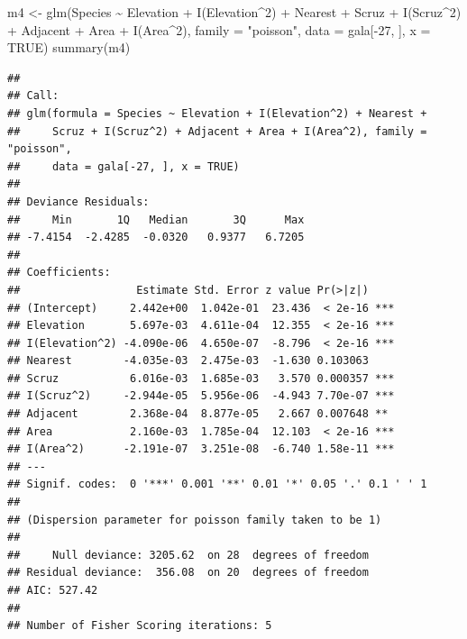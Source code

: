 \documentclass[
  ignorenonframetext,
]{beamer}
\newenvironment{Shaded}{\begin{snugshade}}{\end{snugshade}}
\newcommand{\AttributeTok}[1]{\textcolor[rgb]{0.77,0.63,0.00}{#1}}
\newcommand{\ConstantTok}[1]{\textcolor[rgb]{0.00,0.00,0.00}{#1}}
\newcommand{\DecValTok}[1]{\textcolor[rgb]{0.00,0.00,0.81}{#1}}
\newcommand{\FunctionTok}[1]{\textcolor[rgb]{0.00,0.00,0.00}{#1}}
\newcommand{\NormalTok}[1]{#1}
\newcommand{\OtherTok}[1]{\textcolor[rgb]{0.56,0.35,0.01}{#1}}
\newcommand{\SpecialCharTok}[1]{\textcolor[rgb]{0.00,0.00,0.00}{#1}}
\newcommand{\StringTok}[1]{\textcolor[rgb]{0.31,0.60,0.02}{#1}}
\begin{document}
\begin{frame}[fragile]{}
\protect\hypertarget{section-14}{}
\tiny

\begin{Shaded}
\begin{Highlighting}[]
\NormalTok{m4 }\OtherTok{\textless{}{-}} \FunctionTok{glm}\NormalTok{(Species }\SpecialCharTok{\textasciitilde{}}\NormalTok{ Elevation }\SpecialCharTok{+} \FunctionTok{I}\NormalTok{(Elevation}\SpecialCharTok{\^{}}\DecValTok{2}\NormalTok{) }\SpecialCharTok{+}\NormalTok{ Nearest }\SpecialCharTok{+}\NormalTok{ Scruz }\SpecialCharTok{+} 
            \FunctionTok{I}\NormalTok{(Scruz}\SpecialCharTok{\^{}}\DecValTok{2}\NormalTok{) }\SpecialCharTok{+}\NormalTok{ Adjacent }\SpecialCharTok{+}\NormalTok{ Area }\SpecialCharTok{+} \FunctionTok{I}\NormalTok{(Area}\SpecialCharTok{\^{}}\DecValTok{2}\NormalTok{), }\AttributeTok{family =} \StringTok{"poisson"}\NormalTok{,}
            \AttributeTok{data =}\NormalTok{ gala[}\SpecialCharTok{{-}}\DecValTok{27}\NormalTok{, ], }\AttributeTok{x =} \ConstantTok{TRUE}\NormalTok{)}
\FunctionTok{summary}\NormalTok{(m4)}
\end{Highlighting}
\end{Shaded}

\begin{verbatim}
## 
## Call:
## glm(formula = Species ~ Elevation + I(Elevation^2) + Nearest + 
##     Scruz + I(Scruz^2) + Adjacent + Area + I(Area^2), family = "poisson", 
##     data = gala[-27, ], x = TRUE)
## 
## Deviance Residuals: 
##     Min       1Q   Median       3Q      Max  
## -7.4154  -2.4285  -0.0320   0.9377   6.7205  
## 
## Coefficients:
##                  Estimate Std. Error z value Pr(>|z|)    
## (Intercept)     2.442e+00  1.042e-01  23.436  < 2e-16 ***
## Elevation       5.697e-03  4.611e-04  12.355  < 2e-16 ***
## I(Elevation^2) -4.090e-06  4.650e-07  -8.796  < 2e-16 ***
## Nearest        -4.035e-03  2.475e-03  -1.630 0.103063    
## Scruz           6.016e-03  1.685e-03   3.570 0.000357 ***
## I(Scruz^2)     -2.944e-05  5.956e-06  -4.943 7.70e-07 ***
## Adjacent        2.368e-04  8.877e-05   2.667 0.007648 ** 
## Area            2.160e-03  1.785e-04  12.103  < 2e-16 ***
## I(Area^2)      -2.191e-07  3.251e-08  -6.740 1.58e-11 ***
## ---
## Signif. codes:  0 '***' 0.001 '**' 0.01 '*' 0.05 '.' 0.1 ' ' 1
## 
## (Dispersion parameter for poisson family taken to be 1)
## 
##     Null deviance: 3205.62  on 28  degrees of freedom
## Residual deviance:  356.08  on 20  degrees of freedom
## AIC: 527.42
## 
## Number of Fisher Scoring iterations: 5
\end{verbatim}
\end{frame}
\end{document}
